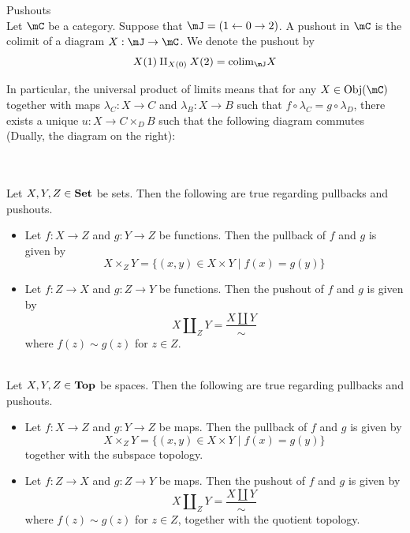\documentclass[a4paper]{article}
\begin{document}
\begin{defn}{Pushouts}{}\\
Let $\mC$ be a category. Suppose that $\mJ=\left(1\leftarrow0\rightarrow2\right)$. A pushout in $\mC$ is the colimit of a diagram $X:\mJ\to\mC$. We denote the pushout by $$X(1)\amalg_{X(0)}X(2)=\text{colim}_\mJ X$$
\end{defn}

In particular, the universal product of limits means that for any $X\in\text{Obj}(\mC)$ together with maps $\lambda_C:X\to C$ and $\lambda_B:X\to B$ such that $f\circ\lambda_C=g\circ\lambda_D$, there exists a unique $u:X\to C\times_DB$ such that the following diagram commutes (Dually, the diagram on the right): \\
\\

\begin{prp}{}{}\\
Let $X,Y,Z\in\bold{Set}$ be sets. Then the following are true regarding pullbacks and pushouts. 
\begin{itemize}
\item Let $f:X\to Z$ and $g:Y\to Z$ be functions. Then the pullback of $f$ and $g$ is given by $$X\times_ZY=\{(x,y)\in X\times Y\;|\;f(x)=g(y)\}$$
\item Let $f:Z\to X$ and $g:Z\to Y$ be functions. Then the pushout of $f$ and $g$ is given by $$X\amalg_ZY=\frac{X\amalg Y}{\sim}$$ where $f(z)\sim g(z)$ for $z\in Z$. 
\end{itemize}
\end{prp}

\begin{prp}{}{}\\
Let $X,Y,Z\in\bold{Top}$ be spaces. Then the following are true regarding pullbacks and pushouts. 
\begin{itemize}
\item Let $f:X\to Z$ and $g:Y\to Z$ be maps. Then the pullback of $f$ and $g$ is given by $$X\times_ZY=\{(x,y)\in X\times Y\;|\;f(x)=g(y)\}$$ together with the subspace topology. 
\item Let $f:Z\to X$ and $g:Z\to Y$ be maps. Then the pushout of $f$ and $g$ is given by $$X\amalg_ZY=\frac{X\amalg Y}{\sim}$$ where $f(z)\sim g(z)$ for $z\in Z$, together with the quotient topology. 
\end{itemize}
\end{prp}
\end{document}
